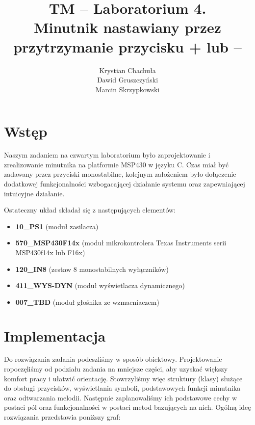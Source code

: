 \documentclass[fleqn]{article}
\title{TM -- Laboratorium 4. \\ \large Minutnik nastawiany przez \\ przytrzymanie przycisku + lub –}
\author{Krystian Chachuła \\ Dawid Gruszczyński \\ Marcin Skrzypkowski}
\begin{document}
\maketitle

\setcounter{page}{0}
\thispagestyle{empty}

\pagebreak

\setcounter{page}{1}

\section{Wstęp}

Naszym zadaniem na czwartym laboratorium było zaprojektowanie i zrealizowanie minutnika na platformie MSP430 w języku C. Czas miał być zadawany przez przyciski monostabilne, kolejnym założeniem było dołączenie dodatkowej funkcjonalności wzbogacającej działanie systemu oraz zapewniającej intuicyjne działanie.

Ostateczny układ składał się z następujących elementów:

\begin{itemize}
	\item \textbf{10\_PS1} (moduł zasilacza)
	\item \textbf{570\_MSP430F14x} (moduł mikrokontrolera Texas Instruments serii MSP430f14x lub F16x)
	\item \textbf{120\_IN8} (zestaw 8 monostabilnych wyłączników)
	\item \textbf{411\_WYS-DYN} (moduł wyświetlacza dynamicznego)
	\item \textbf{007\_TBD} (moduł głośnika ze wzmacniaczem)
\end{itemize}

\pagebreak

\section{Implementacja}

Do rozwiązania zadania podeszliśmy w sposób obiektowy. Projektowanie ropoczęliśmy od podziału zadania na mniejsze części, aby uzyskać większy komfort pracy i ułatwić orientację. Stowrzyliśmy więc struktury (klasy) służące do obsługi przycisków, wyświetlania symboli, podstawowych funkcji minutnika oraz odtwarzania melodii. Następnie zaplanowaliśmy ich podstawowe cechy w postaci pól oraz funkcjonalności w postaci metod bazujących na nich. Ogólną ideę rozwiązania przedstawia poniższy graf: %
\end{document}
